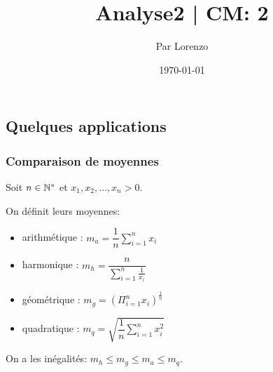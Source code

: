 \documentclass[a4paper, 12pt]{article}
\title{Analyse2 | CM: 2}
\author{Par Lorenzo}
\date{\today}
\begin{document}
\maketitle

\subsection{Quelques applications}

\subsubsection{Comparaison de moyennes}

Soit $n \in \mathbb{N}^*$ et $x_1, x_2, \ldots, x_n \gt 0$.

On définit leurs moyennes:

\begin{itemize}
    \item arithmétique : $m_a = \dfrac{1}{n} \sum_{i=1}^{n}x_i$
    \item harmonique : $m_h = \dfrac{n}{\sum_{i=1}^{n}\frac{1}{x_i}}$
    \item géométrique : $m_g = (\Pi_{i=1}^{n}x_i)^{\frac{1}{n}}$
    \item quadratique : $m_q = \sqrt{\dfrac{1}{n} \sum_{i=1}^{n}x_i^2}$
\end{itemize}

\begin{proprietes}
    On a les inégalités: $m_h \leq m_g \leq m_a \leq m_q$.
\end{proprietes}
\end{document}
